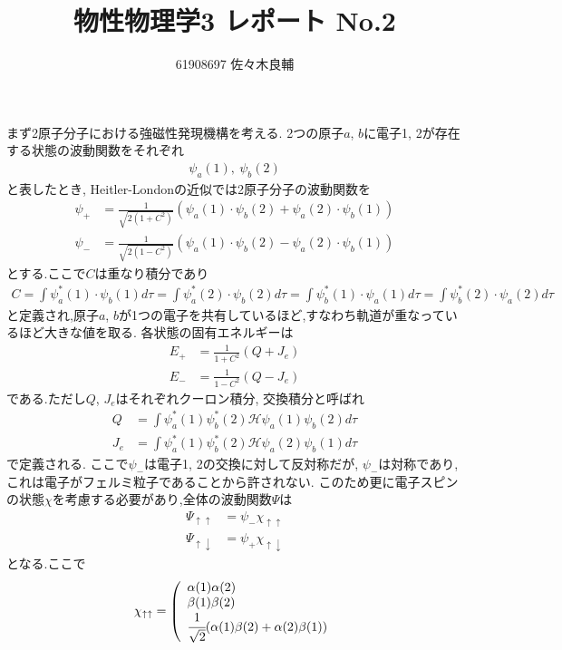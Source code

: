 \documentclass[uplatex,a4j,11pt,dvipdfmx]{jsarticle}
\begin{document}
\title{物性物理学3 レポート No.2}
\author{61908697 佐々木良輔}
\date{}
\maketitle
まず2原子分子における強磁性発現機構を考える.
2つの原子$a$, $b$に電子1, 2が存在する状態の波動関数をそれぞれ
\begin{align}
  \psi_a(1),\ \psi_b(2)
\end{align}
と表したとき,
Heitler-Londonの近似では2原子分子の波動関数を
\begin{align}
  \psi_+&=\frac{1}{\sqrt{2(1+C^2)}}\left(\psi_a(1)\cdot\psi_b(2)+\psi_a(2)\cdot\psi_b(1)\right)\\
  \psi_-&=\frac{1}{\sqrt{2(1-C^2)}}\left(\psi_a(1)\cdot\psi_b(2)-\psi_a(2)\cdot\psi_b(1)\right)
\end{align}
とする.ここで$C$は重なり積分であり
\begin{align}
  C=\int\psi^*_a(1)\cdot\psi_b(1)d\tau
  =\int\psi^*_a(2)\cdot\psi_b(2)d\tau
  =\int\psi^*_b(1)\cdot\psi_a(1)d\tau
  =\int\psi^*_b(2)\cdot\psi_a(2)d\tau
\end{align}
と定義され,原子$a$, $b$が1つの電子を共有しているほど,すなわち軌道が重なっているほど大きな値を取る.
各状態の固有エネルギーは
\begin{align}
  E_+&=\frac{1}{1+C^2}(Q+J_e)\\
  E_-&=\frac{1}{1-C^2}(Q-J_e)
\end{align}
である.ただし$Q$, $J_e$はそれぞれクーロン積分, 交換積分と呼ばれ
\begin{align}
  Q&=\int\psi_a^*(1)\psi_b^*(2)\mathcal{H}\psi_a(1)\psi_b(2)d\tau\\
  \label{equ:Je}
  J_e&=\int\psi_a^*(1)\psi_b^*(2)\mathcal{H}\psi_a(2)\psi_b(1)d\tau
\end{align}
で定義される.
ここで$\psi_-$は電子1, 2の交換に対して反対称だが, $\psi_-$は対称であり,これは電子がフェルミ粒子であることから許されない.
このため更に電子スピンの状態$\chi$を考慮する必要があり,全体の波動関数$\Psi$は
\begin{align}
  \label{equ:psiuu}
  \Psi_{\uparrow\uparrow}&=\psi_-\chi_{\uparrow\uparrow}\\
  \label{equ:psiud}
  \Psi_{\uparrow\downarrow}&=\psi_+\chi_{\uparrow\downarrow}
\end{align}
となる.ここで
\begin{align}
  \chi_{\uparrow\uparrow}=\left(
    \begin{array}{l}
      \alpha(1)\alpha(2)\\
      \beta(1)\beta(2)\\
      \cfrac{1}{\sqrt{2}}(\alpha(1)\beta(2)+\alpha(2)\beta(1))
    \end{array}
  \right.
\end{align}
\end{document}
